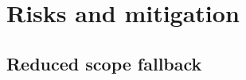 
\section{Risks and mitigation}
\label{sec:risks}


\subsection{Reduced scope fallback}
\label{sec:fallback}

